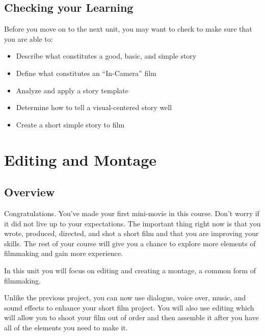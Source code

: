 \documentclass[
]{book}
\providecommand{\tightlist}{%
  \setlength{\itemsep}{0pt}\setlength{\parskip}{0pt}}
\begin{document}
\hypertarget{checking-your-learning-5}{%
\section*{Checking your Learning}\label{checking-your-learning-5}}

\begin{progress}
Before you move on to the next unit, you may want to check to make sure that you are able to:

\begin{itemize}
\tightlist
\item
  Describe what constitutes a good, basic, and simple story\\
\item
  Define what constitutes an ``In-Camera'' film\\
\item
  Analyze and apply a story template\\
\item
  Determine how to tell a visual-centered story well\\
\item
  Create a short simple story to film
\end{itemize}
\end{progress}

\hypertarget{editing-and-montage}{%
\chapter{Editing and Montage}\label{editing-and-montage}}

\hypertarget{overview-6}{%
\section*{Overview}\label{overview-6}}

Congratulations. You've made your first mini-movie in this course. Don't worry if it did not live up to your expectations. The important thing right now is that you wrote, produced, directed, and shot a short film and that you are improving your skills. The rest of your course will give you a chance to explore more elements of filmmaking and gain more experience.

In this unit you will focus on editing and creating a montage, a common form of filmmaking.

Unlike the previous project, you can now use dialogue, voice over, music, and sound effects to enhance your short film project. You will also use editing which will allow you to shoot your film out of order and then assemble it after you have all of the elements you need to make it.
\end{document}
